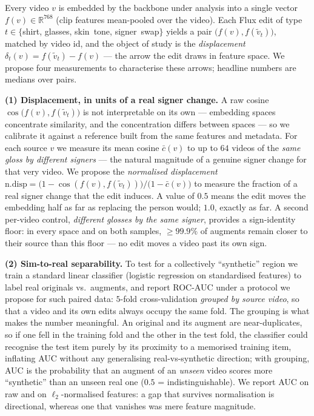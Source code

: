 Every video $v$ is embedded by the backbone under analysis into a single
vector $f(v)\in\mathbb{R}^{768}$ (clip features mean-pooled over the video).
Each Flux edit of type
$t\in\{$shirt, glasses, skin~tone, signer~swap$\}$
yields a pair $\big(f(v),f(\tilde{v}_t)\big)$, matched by video id, and the
object of study is the \emph{displacement}
$\delta_t(v)=f(\tilde{v}_t)-f(v)$ --- the arrow the edit draws in feature
space. We propose four measurements to characterise these arrows; headline
numbers are medians over pairs.

\textbf{(1) Displacement, in units of a real signer change.} A raw cosine
$\cos\big(f(v),f(\tilde{v}_t)\big)$ is not interpretable on its own ---
embedding spaces concentrate similarity, and the concentration differs
between spaces --- so we calibrate it against a reference built from the
same features and metadata. For each source $v$ we measure its mean cosine
$\bar{c}(v)$ to up to $64$ videos of the \emph{same gloss by different
signers} --- the natural magnitude of a genuine signer change for that very
video. We propose the \emph{normalised displacement}
$\mathrm{n.disp}=\big(1-\cos(f(v),f(\tilde{v}_t))\big)/\big(1-\bar{c}(v)\big)$
to measure the fraction of a real signer change that the edit induces. A value of
$0.5$ means the edit moves the embedding half as far as replacing the
person would; $1.0$, exactly as far. A second per-video control,
\emph{different glosses by the same signer}, provides a sign-identity
floor: in every space and on both samples, $\geq 99.9\%$ of augments remain
closer to their source than this floor --- no edit moves a video past its
own sign.

\textbf{(2) Sim-to-real separability.} To test for a collectively
``synthetic'' region we train a standard linear classifier (logistic
regression on
standardised features) to label real originals vs.\ augments, and report
ROC-AUC under a protocol we propose for such paired data: $5$-fold
cross-validation \emph{grouped by source video}, so that a
video and its own edits always occupy the same fold. The grouping is what
makes the number meaningful. An original and its augment are
near-duplicates, so if one fell in the training fold and the other in the
test fold, the classifier could recognise the test item purely by its
proximity to a memorised training item, inflating AUC without any
generalising real-vs-synthetic direction; with grouping, AUC is the
probability that an augment of an \emph{unseen} video scores more
``synthetic'' than an unseen real one ($0.5$ = indistinguishable). We
report AUC on raw and on $\ell_2$-normalised features: a gap that survives
normalisation is directional, whereas one that vanishes was mere feature
magnitude.

